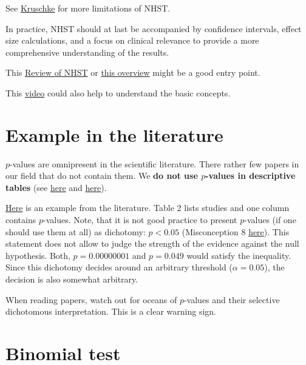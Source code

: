 \documentclass[
]{book}
\begin{document}
See \href{https://www.krigolsonteaching.com/uploads/4/3/8/4/43848243/kruschke2012jepg.pdf}{Kruschke} for more limitations of NHST.

In practice, NHST should at last be accompanied by confidence intervals,
effect size calculations, and a focus on clinical relevance to provide
a more comprehensive understanding of the results.

This \href{https://f1000research.com/articles/4-621/v3}{Review of NHST} or
\href{https://en.wikipedia.org/wiki/Statistical_hypothesis_test}{this overview} might be a good entry point.

This \href{https://www.youtube.com/watch?v=FZ2_hzMyJpY&ab_channel=VeryNormal}{video} could also help to understand the basic concepts.

\section{Example in the literature}\label{example-in-the-literature}

\(p\)-values are omnipresent in the scientific literature. There rather few papers in our field that do not contain them.
We \textbf{do not use \(p\)-values in descriptive tables}
(see \href{https://epitodate.com/the-balance-test-fallacy-why-you-shouldnt-put-p-values-in-table-1/}{here} and
\href{https://www.acpjournals.org/doi/10.7326/0003-4819-147-8-200710160-00010-w1}{here}).

\href{https://www.tandfonline.com/doi/full/10.1080/09593980601023754\#d1e100}{Here} is an example from the literature.
Table 2 lists studies and one column contains \(p\)-values. Note, that it is not good practice to present \(p\)-values
(if one should use them at all) as dichotomy: \(p < 0.05\)
(Misconception 8 \href{https://sixsigmadsi.com/wp-content/uploads/2020/10/A-Dirty-Dozen-Twelve-P-Value-Misconceptions.pdf}{here}). This statement does
not allow to judge the strength of the evidence against the null hypothesis. Both, \(p = 0.00000001\) and \(p = 0.049\) would satisfy
the inequality. Since this dichotomy decides around an arbitrary threshold (\(\alpha = 0.05\)),
the decision is also somewhat arbitrary.

When reading papers, watch out for oceans of \(p\)-values and their selective dichotomous interpretation. This is a clear warning sign.

\section{Binomial test}\label{binomial-test}
\end{document}
